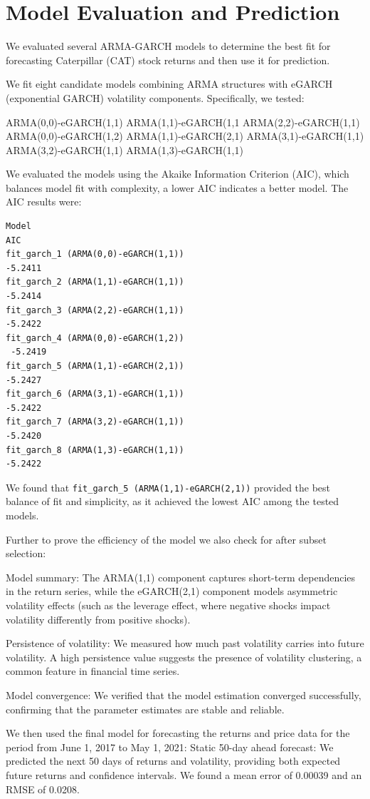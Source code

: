 \documentclass{article}
\begin{document}
\section{Model Evaluation and Prediction}
We evaluated several ARMA-GARCH models to determine the best fit for forecasting Caterpillar (CAT) stock returns and then use it for prediction.

We fit eight candidate models combining ARMA structures with eGARCH (exponential GARCH) volatility components. Specifically, we tested:

ARMA(0,0)-eGARCH(1,1)
ARMA(1,1)-eGARCH(1,1
ARMA(2,2)-eGARCH(1,1)
ARMA(0,0)-eGARCH(1,2)
ARMA(1,1)-eGARCH(2,1)
ARMA(3,1)-eGARCH(1,1)
ARMA(3,2)-eGARCH(1,1)
ARMA(1,3)-eGARCH(1,1)

We evaluated the models using the Akaike Information Criterion (AIC), which balances model fit with complexity, a lower AIC indicates a better model. The AIC results were:
\begin{verbatim}
Model
AIC
fit_garch_1 (ARMA(0,0)-eGARCH(1,1))
-5.2411 
fit_garch_2 (ARMA(1,1)-eGARCH(1,1))
-5.2414
fit_garch_3 (ARMA(2,2)-eGARCH(1,1))
-5.2422
fit_garch_4 (ARMA(0,0)-eGARCH(1,2))
 -5.2419
fit_garch_5 (ARMA(1,1)-eGARCH(2,1))
-5.2427
fit_garch_6 (ARMA(3,1)-eGARCH(1,1))
-5.2422
fit_garch_7 (ARMA(3,2)-eGARCH(1,1))
-5.2420
fit_garch_8 (ARMA(1,3)-eGARCH(1,1))
-5.2422
\end{verbatim}

We found that \texttt{fit\_garch\_5 (ARMA(1,1)-eGARCH(2,1))} provided the best balance of fit and simplicity, as it achieved the lowest AIC among the tested models.

Further to prove the efficiency of the model we also check for after subset selection:

Model summary: The ARMA(1,1) component captures short-term dependencies in the return series, while the eGARCH(2,1) component models asymmetric volatility effects (such as the leverage effect, where negative shocks impact volatility differently from positive shocks).


Persistence of volatility: We measured how much past volatility carries into future volatility. A high persistence value suggests the presence of volatility clustering, a common feature in financial time series.


Model convergence: We verified that the model estimation converged successfully, confirming that the parameter estimates are stable and reliable.

 We then used the final model for forecasting the returns and price data for the period from June 1, 2017 to May 1, 2021:
Static 50-day ahead forecast: We predicted the next 50 days of returns and volatility, providing both expected future returns and confidence intervals. We found a mean error of 0.00039 and an RMSE of 0.0208.
\end{document}

